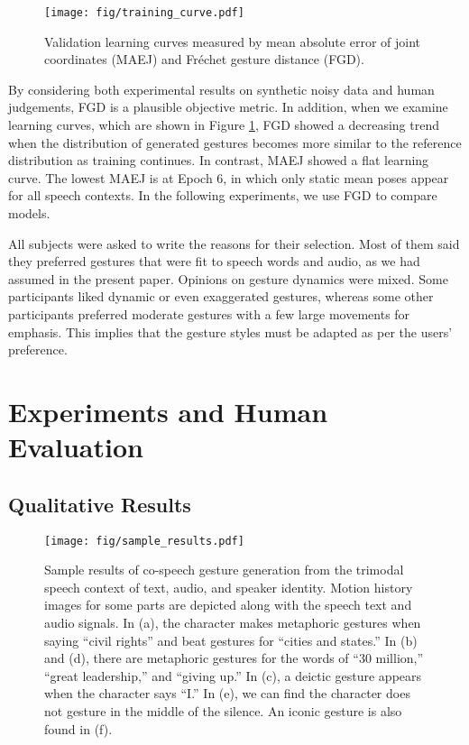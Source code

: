 \documentclass[acmtog]{acmart}
\begin{document}
\begin{figure}
  \centering
  \texttt{[image: fig/training\_curve.pdf]}
  \caption{Validation learning curves measured by mean absolute error of joint coordinates (MAEJ) and Fr\'{e}chet gesture distance (FGD).}
  \label{fig:train_curve}
\end{figure}

By considering both experimental results on synthetic noisy data and human judgements, FGD is a plausible objective metric. In addition, when we examine learning curves, which are shown in Figure \ref{fig:train_curve}, FGD showed a decreasing trend when the distribution of generated gestures becomes more similar to the reference distribution as training continues. In contrast, MAEJ showed a flat learning curve. The lowest MAEJ is at Epoch 6, in which only static mean poses appear for all speech contexts. In the following experiments, we use FGD to compare models.

All subjects were asked to write the reasons for their selection. Most of them said they preferred gestures that were fit to speech words and audio, as we had assumed in the present paper. Opinions on gesture dynamics were mixed. Some participants liked dynamic or even exaggerated gestures, whereas some other participants preferred moderate gestures with a few large movements for emphasis. This implies that the gesture styles must be adapted as per the users' preference. \section{Experiments and Human Evaluation} \label{sec:experiment}

\subsection{Qualitative Results}

\begin{figure*}
  \centering
  \texttt{[image: fig/sample\_results.pdf]}
  \caption{Sample results of co-speech gesture generation from the trimodal speech context of text, audio, and speaker identity. Motion history images for some parts are depicted along with the speech text and audio signals. In (a), the character makes metaphoric gestures when saying ``civil rights'' and beat gestures for ``cities and states.'' In (b) and (d), there are metaphoric gestures for the words of ``30 million,'' ``great leadership,'' and ``giving up.'' In (c), a deictic gesture appears when the character says ``I.'' In (e), we can find the character does not gesture in the middle of the silence. An iconic gesture is also found in (f).}
  \label{fig:samples}
\end{figure*}
\end{document}
